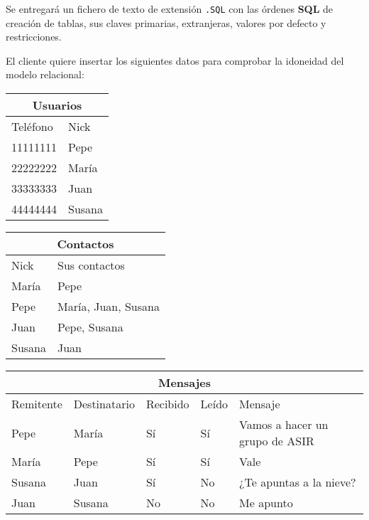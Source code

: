 \begin{homeworkProblem}
  Se entregará un fichero de texto de extensión \texttt{.SQL} con las órdenes \textbf{SQL} de creación de tablas, sus claves primarias, extranjeras, valores por defecto y restricciones.

\end{homeworkProblem}



\begin{homeworkProblem}

  El cliente quiere insertar los siguientes datos para comprobar la idoneidad del modelo relacional:
  
  \begin{tabular}{|l|l|}
    \hline
    \multicolumn{2}{|c|}{Usuarios} \\
    \hline
    Teléfono & Nick \\
    \hline
    11111111 & Pepe \\
    22222222 & María \\
    33333333 & Juan \\
    44444444 & Susana \\
    \hline
  \end{tabular}
  \begin{tabular}{|l|l|}
    \hline
    \multicolumn{2}{|c|}{Contactos} \\
    \hline
    Nick & Sus contactos\\
    \hline
    María & Pepe \\
    Pepe & María, Juan, Susana \\
    Juan & Pepe, Susana \\
    Susana & Juan \\
    \hline
  \end{tabular}
  
  \begin{tabular}{|l|l|l|l|l|}
    \hline
    \multicolumn{5}{|c|}{Mensajes} \\
    \hline
    Remitente & Destinatario & Recibido & Leído & Mensaje \\
    \hline
    Pepe & María & Sí & Sí & Vamos a hacer un grupo de ASIR \\
    María & Pepe & Sí & Sí & Vale \\
    Susana & Juan & Sí & No & ¿Te apuntas a la nieve? \\
    Juan & Susana & No & No & Me apunto \\
    \hline
  \end{tabular}
  

\end{homeworkProblem}
